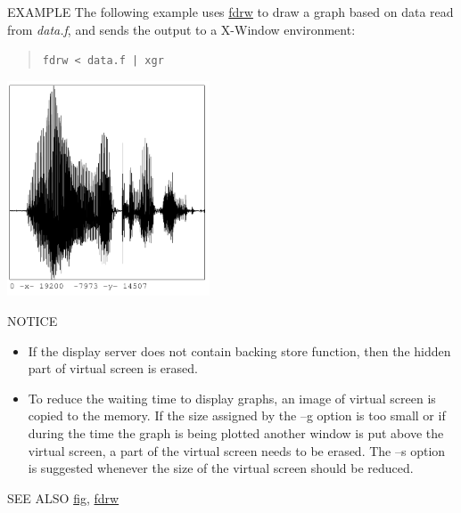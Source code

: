 \begin{options}
\end{options}
\begin{qsection}{EXAMPLE}
The following example uses \hyperlink{fdrw}{fdrw} to draw a graph based on data read
from {\em data.f}, and sends the output to a X-Window environment:
\begin{quote}
 \verb!fdrw < data.f | xgr!
\end{quote}
\begin{center}
\includegraphics[width=6cm]{fig/xgr.pdf}
\end{center}
\end{qsection}
\begin{qsection}{NOTICE}
\begin{itemize}
\item If the display server does not contain backing store function,
then the hidden part of virtual screen is erased.

\item To reduce the waiting time to display graphs,
an image of virtual screen is copied to the memory.
If the size assigned by the --g option is too small
or if during the time the graph is being plotted another window
is put above the virtual screen, a part of the virtual screen
needs to be erased.
The --s option is suggested whenever the size of
the virtual screen should be reduced.
\end{itemize}

\end{qsection}
\begin{qsection}{SEE ALSO}
\hyperlink{fig}{fig},
\hyperlink{fdrw}{fdrw}
\end{qsection}
